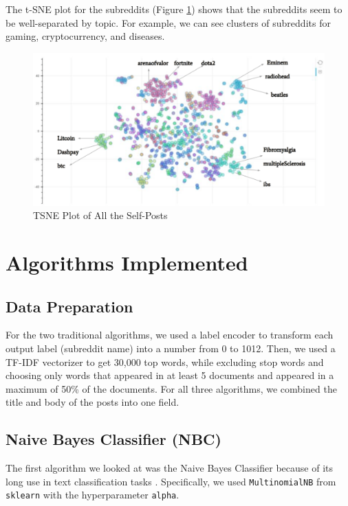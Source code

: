 \documentclass{sig-alternate-05-2015}
\begin{document}
The t-SNE\cite{tsne} plot for the subreddits (Figure \ref{fig:tsnePlot}) shows that the subreddits seem to be well-separated by topic. For example, we can see clusters of subreddits for gaming, cryptocurrency, and diseases.

\begin{figure}[H]
\centering
\includegraphics[width=\linewidth]{plots/tsne.png}
\caption{TSNE Plot of All the Self-Posts}
\label{fig:tsnePlot}
\end{figure}

\section{Algorithms Implemented}

\subsection{Data Preparation}

For the two traditional algorithms, we used a label encoder to transform each output label (subreddit name) into a number from 0 to 1012. Then, we used a TF-IDF vectorizer to get 30,000 top words, while excluding stop words and choosing only words that appeared in at least 5 documents and appeared in a maximum of 50\% of the documents. For all three algorithms, we combined the title and body of the posts into one field.

\subsection{Naive Bayes Classifier (NBC)}

The first algorithm we looked at was the Naive Bayes Classifier because of its long use in text classification tasks \cite{rennie2001:improving}. Specifically, we used \verb+MultinomialNB+ from \verb+sklearn+ with the hyperparameter \verb+alpha+.
\end{document}
